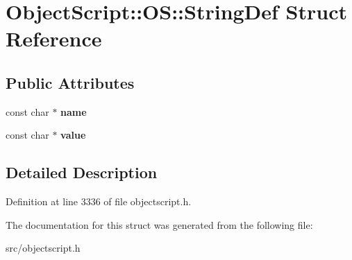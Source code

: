 \hypertarget{struct_object_script_1_1_o_s_1_1_string_def}{}\section{Object\+Script\+:\+:OS\+:\+:String\+Def Struct Reference}
\label{struct_object_script_1_1_o_s_1_1_string_def}
\subsection*{Public Attributes}
\begin{DoxyCompactItemize}
\item 
const char $\ast$ {\bfseries name}\hypertarget{struct_object_script_1_1_o_s_1_1_string_def_ad751ee12a84d9f6a273f400391032b36}{}\label{struct_object_script_1_1_o_s_1_1_string_def_ad751ee12a84d9f6a273f400391032b36}

\item 
const char $\ast$ {\bfseries value}\hypertarget{struct_object_script_1_1_o_s_1_1_string_def_ae8aa022b142b2eccd80620e431f102b8}{}\label{struct_object_script_1_1_o_s_1_1_string_def_ae8aa022b142b2eccd80620e431f102b8}

\end{DoxyCompactItemize}


\subsection{Detailed Description}


Definition at line 3336 of file objectscript.\+h.



The documentation for this struct was generated from the following file\+:\begin{DoxyCompactItemize}
\item 
src/objectscript.\+h\end{DoxyCompactItemize}
